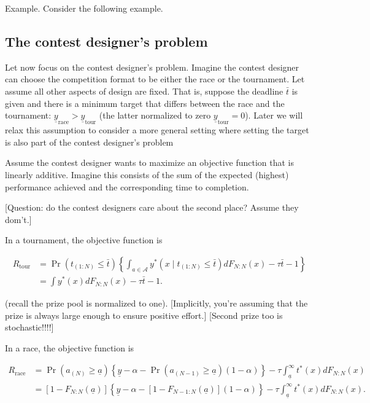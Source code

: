 \documentclass[12pt,]{article}
\newcommand\deadline{\bar{t}}
\newcommand\target{\underline{y}}
\newcommand\race{\text{race}}
\newcommand\tournament{\text{tour}}
\newcommand\mtype{\underline{a}}
\begin{document}
Example. Consider the following example.

\subsection{The contest designer's
problem}\label{the-contest-designers-problem}

Let now focus on the contest designer's problem. Imagine the contest
designer can choose the competition format to be either the race or the
tournament. Let assume all other aspects of design are fixed. That is,
suppose the deadline \(\deadline\) is given and there is a minimum
target that differs between the race and the tournament:
\(\target_\race > \target_\tournament\) (the latter normalized to zero
\(\target_\tournament=0\)). Later we will relax this assumption to
consider a more general setting where setting the target is also part of
the contest designer's problem

Assume the contest designer wants to maximize an objective function that
is linearly additive. Imagine this consists of the sum of the expected
(highest) performance achieved and the corresponding time to completion.

{[}Question: do the contest designers care about the second place?
Assume they dom't.{]}

In a tournament, the objective function is

\begin{align}
R_\tournament & = \Pr(t_{(1:N)}\leq \deadline) \left\{\int_{a\in\mathcal A} y^*(x \mid t_{(1:N)}\leq \deadline) dF_{N:N}(x) - \tau \deadline - 1 \right\} \nonumber\\
  & = \int y^*(x) dF_{N:N}(x) - \tau \deadline - 1. 
\end{align}

(recall the prize pool is normalized to one). {[}Implicitly, you're
assuming that the prize is always large enough to ensure positive
effort.{]} {[}Second prize too is stochastic!!!!{]}

In a race, the objective function is

\begin{align}
R_\race & =  
  \Pr(a_{(N)}\geq \mtype) \left\{\target - \alpha -
  \Pr(a_{(N-1)}\geq \mtype) (1-\alpha) \right\}
  - \tau \int_{\mtype}^{\infty} t^*(x) dF_{N:N}(x) \nonumber\\
  & = [1-F_{N:N}(\mtype)] \left\{\target - \alpha -
  [1-F_{N-1:N}(\mtype)] (1 - \alpha) \right\}
  - \tau \int_{\mtype}^{\infty} t^*(x) dF_{N:N}(x).
\end{align}
\end{document}

